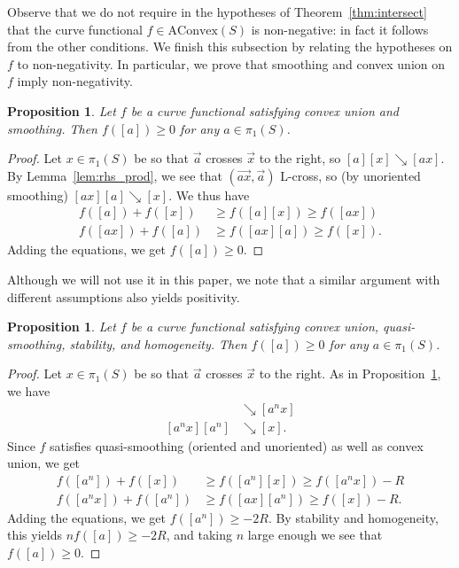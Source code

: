 \documentclass[11pt]{amsart}
\newcommand{\ora}[1]{\overrightarrow{#1}}
\numberwithin{equation}{section}
\numberwithin{figure}{section}
\newtheorem{proposition}[theorem]{Proposition}
\theoremstyle{definition}
\theoremstyle{plain}
\newcommand{\AConvex}{\mathrm{AConvex}}
\newcommand{\reducesto}{\mathrel{\searrow}}
\begin{document}
Observe that we do not require in the hypotheses of
Theorem~\ref{thm:intersect} that the curve
functional $f \in \AConvex(S)$ is non-negative: in fact it follows
from the other conditions.
We finish this subsection by relating the hypotheses on $f$ to non-negativity. In particular, we prove that smoothing and convex union on~$f$ imply non-negativity.

\begin{proposition}
  Let $f$ be a curve functional satisfying convex union and smoothing. Then $f([a]) \geq 0$ for any $a \in \pi_1(S)$.
  \label{prop:curve-positive}
\end{proposition}
\begin{proof}
Let $x \in \pi_1(S)$ be so that $\ora{a}$ crosses $\ora{x}$ to the
right, so
$[a][x] \reducesto [ax]$.
By Lemma~\ref{lem:rhs_prod}, we see that
$(\ora{ax},\ora{a})$ L-cross, so
(by unoriented smoothing) $[ax][a]
\reducesto [x]$. We thus have
\begin{align*}
    f([a]) + f([x]) &\geq f([a] [x]) \geq f([ax])\\
     f([ax]) + f([a]) &\geq f([ax] [a]) \geq f([x]).
\end{align*}
Adding the equations, we get $f([a]) \geq 0$.
\end{proof}

Although we will not use it in this paper, we note that a similar
argument with different assumptions also yields positivity.

\begin{proposition}
  Let $f$ be a curve functional satisfying convex union, quasi-smoothing,
  stability, and homogeneity. Then $f([a]) \geq 0$ for any $a \in
  \pi_1(S)$.
  \label{prop:curve-positive2}
\end{proposition}

\begin{proof}
Let $x \in \pi_1(S)$ be so that $\ora{a}$ crosses $\ora{x}$ to the
right. As in Proposition~\ref{prop:curve-positive}, we have
\begin{align*}
[a^n][x] &\reducesto [a^nx]\\
[a^nx][a^n]&\reducesto [x].
\end{align*}
Since $f$ satisfies quasi-smoothing (oriented and unoriented) as well as convex union, we get
\begin{align*}
    f([a^n]) + f([x]) &\geq f([a^n] [x]) \geq f([a^nx]) - R\\
     f([a^nx]) + f([a^n]) &\geq f([ax] [a^n]) \geq f([x]) - R.
\end{align*}
Adding the equations, we get $f([a^n]) \geq -2R$. By stability and
homogeneity, this yields $n f([a]) \geq -2R$, and taking $n$ large
enough we see that $f([a]) \geq 0$.
\end{proof}
\end{document}
